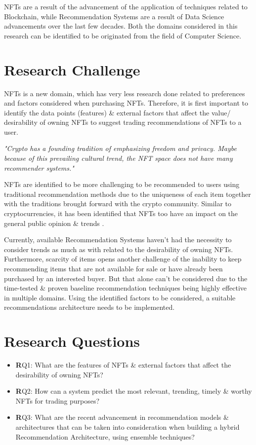 \bigbreak
NFTs are a result of the advancement of the application of techniques related to Blockchain, while Recommendation Systems are a result of Data Science advancements over the last few decades. Both the domains considered in this research can be identified to be originated from the field of Computer Science.


\section{Research Challenge}
NFTs is a new domain, which has very less research done related to preferences and factors considered when purchasing NFTs.
Therefore, it is first important to identify the data points (features) \& external factors that affect the value/ desirability of owning NFTs to suggest trading recommendations of NFTs to a user.

\bigbreak
\textit{"Crypto has a founding tradition of emphasizing freedom and privacy. Maybe because of this prevailing cultural trend, the NFT space does not have many recommender systems."} \autocite{noauthor_what_2020}

NFTs are identified to be more challenging to be recommended to users using traditional recommendation methods due to the uniqueness of each item together with the traditions brought forward with the crypto community.
Similar to cryptocurrencies, it has been identified that NFTs too have an impact on the general public opinion \& trends \autocite{dowling_fertile_2021}.

Currently, available Recommendation Systems haven't had the necessity to consider trends as much as with related to the desirability of owning NFTs. Furthermore, scarcity of items opens another challenge of the inability to keep recommending items that are not available for sale or have already been purchased by an interested buyer. But that alone can't be considered due to the time-tested \& proven baseline recommendation techniques being highly effective in multiple domains. Using the identified factors to be considered, a suitable recommendations architecture needs to be implemented.

\section{Research Questions}

\begin{itemize}[label={}]
  \item {\textbf RQ1:} What are the features of NFTs \& external factors that affect the desirability of owning NFTs?
  \item {\textbf RQ2:} How can a system predict the most relevant, trending, timely \& worthy NFTs for trading purposes?
  \item {\textbf RQ3:} What are the recent advancement in recommendation models \& architectures that can be taken into consideration when building a hybrid Recommendation Architecture, using ensemble techniques? 
\end{itemize}

